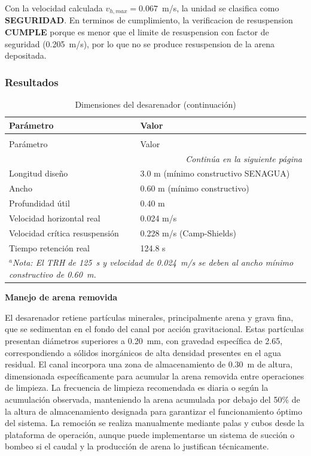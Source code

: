 \documentclass[12pt,a4paper]{article}
\begin{document}
Con la velocidad calculada $v_{h,max} = 0.067$~m/s, la unidad se clasifica como \textbf{SEGURIDAD}. En terminos de cumplimiento, la verificacion de resuspension \textbf{CUMPLE} porque es menor que el limite de resuspension con factor de seguridad (0.205~m/s), por lo que no se produce resuspension de la arena depositada.

\subsubsection{Resultados}

\begingroup
\small
\begin{longtable}{l p{9cm}}
\caption{Dimensiones del desarenador}\\
\toprule
Par\'ametro & Valor \\
\midrule
\endfirsthead
\caption[]{Dimensiones del desarenador (continuación)}\\
\toprule
Par\'ametro & Valor \\
\midrule
\endhead
\midrule
\multicolumn{2}{r}{\textit{Continúa en la siguiente página}} \\
\endfoot
\bottomrule
\endlastfoot
Longitud dise\~no & 3.0 m (m\'inimo constructivo SENAGUA) \\
Ancho & 0.60 m (m\'inimo constructivo) \\
Profundidad \'util & 0.40 m \\
Velocidad horizontal real & 0.024 m/s \\
Velocidad cr\'itica resuspensi\'on & 0.228 m/s (Camp-Shields) \\
Tiempo retenci\'on real & 124.8 s \\
\multicolumn{2}{p{\textwidth}}{\small\textit{$^a$Nota: El TRH de 125~s y velocidad de 0.024~m/s se deben al ancho m\'inimo constructivo de 0.60~m. }} \\
\end{longtable}
\endgroup

\textbf{Manejo de arena removida}

El desarenador retiene part\'iculas minerales, principalmente arena y grava fina, que se sedimentan en el fondo del canal por acci\'on gravitacional. Estas part\'iculas presentan di\'ametros superiores a 0.20~mm, con gravedad espec\'ifica de 2.65, correspondiendo a s\'olidos inorg\'anicos de alta densidad presentes en el agua residual. El canal incorpora una zona de almacenamiento de 0.30~m de altura, dimensionada espec\'ificamente para acumular la arena removida entre operaciones de limpieza. La frecuencia de limpieza recomendada es diaria o seg\'un la acumulaci\'on observada, manteniendo la arena acumulada por debajo del 50\% de la altura de almacenamiento designada para garantizar el funcionamiento \'optimo del sistema. La remoci\'on se realiza manualmente mediante palas y cubos desde la plataforma de operaci\'on, aunque puede implementarse un sistema de succi\'on o bombeo si el caudal y la producci\'on de arena lo justifican t\'ecnicamente.
\end{document}
